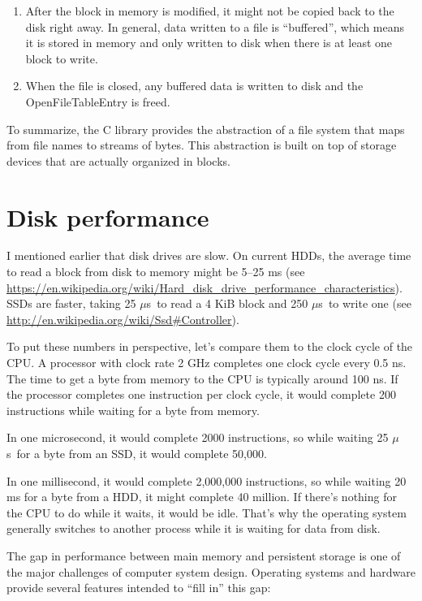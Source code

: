 \documentclass[12pt]{book}
\begin{document}
{\begin{enumerate}
\item After the block in memory is modified, it might not be copied
  back to the disk right away.  In general, data written to a file is
  ``buffered'', which means it is stored in memory and only written to
  disk when there is at least one block to write.

\item When the file is closed, any buffered data is written to disk
  and the OpenFileTableEntry is freed.

\end{enumerate}

To summarize, the C library provides the abstraction of a file
system that maps from file names to streams of bytes.  This abstraction
is built on top of storage devices that are actually organized
in blocks.


\section{Disk performance}

\newcommand{\mus}{$\mu$s~}

I mentioned earlier that disk drives are slow.  On current HDDs, the
average time to read a block from disk to memory might be 5--25 ms
(see \url{https://en.wikipedia.org/wiki/Hard_disk_drive_performance_characteristics}).
SSDs are faster, taking 25 \mus to read a 4 KiB block and 250 \mus to
write one (see \url{http://en.wikipedia.org/wiki/Ssd#Controller}).

To put these numbers in perspective, let's compare them to the clock
cycle of the CPU.  A processor with clock rate 2 GHz completes one
clock cycle every 0.5 ns.  The time to get a byte from memory to
the CPU is typically around 100 ns.  If the processor completes one
instruction per clock cycle, it would complete 200 instructions
while waiting for a byte from memory.

In one microsecond, it would complete 2000 instructions,
so while waiting 25 \mus for a byte from an SSD, it would complete 50,000.

In one millisecond, it would complete 2,000,000 instructions,
so while waiting 20 ms for a byte from a HDD, it might complete
40 million.  If there's nothing for the CPU to do while it waits,
it would be idle.  That's why the operating system generally
switches to another process while it is waiting for data from disk.

The gap in performance between main memory and persistent storage is
one of the major challenges of computer system design.  Operating
systems and hardware provide several features intended to ``fill in''
this gap:

}
\end{document}
